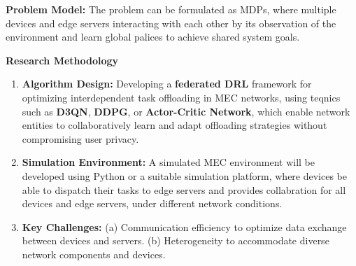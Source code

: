 \documentclass[12pt]{article}
\begin{document}
\vspace{3mm}

\noindent\textbf{\large Problem Model: } The problem can be formulated as MDPs, where multiple devices and edge servers interacting with each other by its observation of the environment and learn global palices to achieve shared system goals.
\noindent



\vspace{5mm}

\noindent\textbf{\large Research Methodology}

\begin{enumerate} \item \textbf{Algorithm Design:} Developing a  \textbf{federated DRL} framework for optimizing interdependent task offloading in MEC networks, using teqnics such as \textbf{D3QN},  \textbf{DDPG}, or  \textbf{Actor-Critic Network}, which enable network entities to collaboratively learn and adapt offloading strategies without compromising user privacy. \item \textbf{Simulation Environment:} A simulated MEC environment will be developed using Python or a suitable simulation platform, where devices be able to dispatch their tasks to edge servers and provides collabration for all devices and edge servers, under different network conditions. 
	
	
	\item \textbf{Key Challenges:} (a) Communication efficiency to optimize data exchange between devices and servers.  (b) Heterogeneity to accommodate diverse network components and devices.
\end{enumerate}






\end{document}
